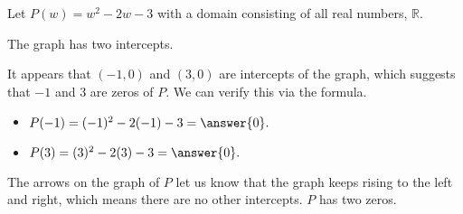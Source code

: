 \documentclass{ximera}
\begin{document}
\begin{example}

Let $P(w) = w^2 - 2w - 3$ with a domain consisting of all real numbers, $\mathbb{R}$.






\begin{image}
\end{image}
The graph has two intercepts.

It appears that $(-1,0)$ and $(3,0)$ are intercepts of the graph, which suggests that $-1$ and $3$ are zeros of $P$.  We can verify this via the formula.


\begin{itemize}
\item $P(-1) = (-1)^2 -2(-1) - 3 = \answer{0}.$
\item $P(3) = (3)^2 -2(3) - 3 = \answer{0}.$
\end{itemize}


The arrows on the graph of $P$ let us know that the graph keeps rising to the left and right, which means there are no other intercepts. $P$ has two zeros.


\end{example}
\end{document}
